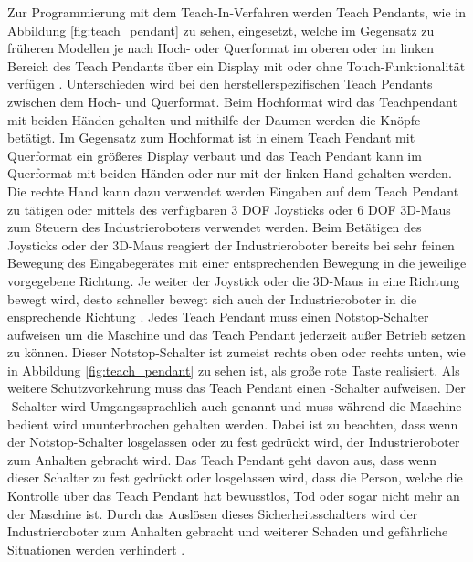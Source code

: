 Zur Programmierung mit dem Teach-In-Verfahren werden Teach Pendants, wie in Abbildung \ref{fig:teach_pendant} zu sehen, eingesetzt, welche im Gegensatz zu früheren Modellen je nach Hoch- oder Querformat im oberen oder im linken Bereich des Teach Pendants über ein Display mit oder ohne Touch-Funktionalität verfügen \cite{nof_handbook_1999}. Unterschieden wird bei den herstellerspezifischen Teach Pendants zwischen dem Hoch- und Querformat. Beim Hochformat wird das Teachpendant mit beiden Händen gehalten und mithilfe der Daumen werden die Knöpfe betätigt. Im Gegensatz zum Hochformat ist in einem Teach Pendant mit Querformat ein größeres Display verbaut und das Teach Pendant kann im Querformat mit beiden Händen oder nur mit der linken Hand gehalten werden. Die rechte Hand kann dazu verwendet werden Eingaben auf dem Teach Pendant zu tätigen oder mittels des verfügbaren 3 DOF Joysticks oder 6 DOF 3D-Maus zum Steuern des Industrieroboters verwendet werden. Beim Betätigen des Joysticks oder der 3D-Maus reagiert der Industrieroboter bereits bei sehr feinen Bewegung des Eingabegerätes mit einer entsprechenden Bewegung in die jeweilige vorgegebene Richtung. Je weiter der Joystick oder die 3D-Maus in eine Richtung bewegt wird, desto schneller bewegt sich auch der Industrieroboter in die ensprechende Richtung \cite[48\psq]{prassler_advances_2004}. Jedes Teach Pendant muss einen Notstop-Schalter aufweisen um die Maschine und das Teach Pendant jederzeit außer Betrieb setzen zu können. Dieser Notstop-Schalter ist zumeist rechts oben oder rechts unten, wie in Abbildung \ref{fig:teach_pendant} zu sehen ist, als große rote Taste realisiert. Als weitere Schutzvorkehrung muss das Teach Pendant einen -Schalter aufweisen. Der -Schalter wird Umgangssprachlich auch  genannt und muss während die Maschine bedient wird ununterbrochen gehalten werden. Dabei ist zu beachten, dass wenn der Notstop-Schalter losgelassen oder zu fest gedrückt wird, der Industrieroboter zum Anhalten gebracht wird. Das Teach Pendant geht davon aus, dass wenn dieser Schalter zu fest gedrückt oder losgelassen wird, dass die Person, welche die Kontrolle über das Teach Pendant hat bewusstlos, Tod oder sogar nicht mehr an der Maschine ist. Durch das Auslösen dieses Sicherheitsschalters wird der Industrieroboter zum Anhalten gebracht und weiterer Schaden und gefährliche Situationen werden verhindert \cite{dead_man_switch_2020}.\\

